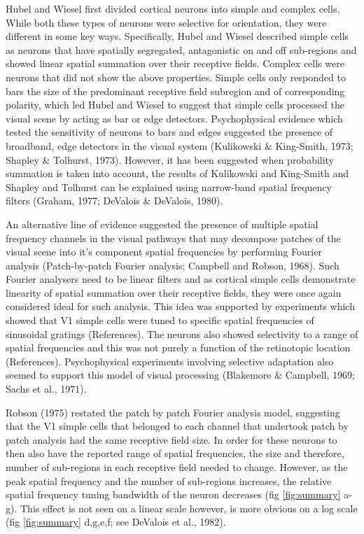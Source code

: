 	Hubel and Wiesel first divided cortical neurons into simple and complex cells. While both these types of neurons were selective for orientation, they were different in some key ways. Specifically, Hubel and Wiesel described simple cells as neurons that have spatially segregated, antagonistic on and off sub-regions and showed linear spatial summation over their receptive fields. Complex cells were neurons that did not show the above properties. Simple cells only responded to bars the size of the predominant receptive field subregion and of corresponding polarity, which led Hubel and Wiesel to suggest that simple cells processed the visual scene by acting as bar or edge detectors. Psychophysical evidence which tested the sensitivity of neurons to bars and edges suggested the presence of broadband, edge detectors in the visual system (Kulikowski \& King-Smith, 1973; Shapley \& Tolhurst, 1973). However, it has been suggested when probability summation is taken into account, the results of Kulikowski and King-Smith and Shapley and Tolhurst can be explained using narrow-band spatial frequency filters (Graham, 1977; DeValois \& DeValois, 1980).
	
	An alternative line of evidence suggested the presence of multiple spatial frequency channels in the visual pathways that may decompose patches of the visual scene into it's component spatial frequencies by performing Fourier analysis (Patch-by-patch Fourier analysis; Campbell and Robson, 1968). Such Fourier analysers need to be linear filters and as cortical simple cells demonstrate linearity of spatial summation over their receptive fields, they were once again considered ideal for such analysis. This idea was supported by experiments which showed that V1 simple cells were tuned to specific spatial frequencies of sinusoidal gratings (References). The neurons also showed selectivity to a range of spatial frequencies and this was not purely a function of the retinotopic location (References). Psychophysical experiments involving selective adaptation also seemed to support this model of visual processing (Blakemore \& Campbell, 1969; Sachs et al., 1971).
	
	Robson (1975) restated the patch by patch Fourier analysis model, suggesting that the V1 simple cells that belonged to each channel that undertook patch by patch analysis had the same receptive field size. In order for these neurons to then also have the reported range of spatial frequencies, the size and therefore, number of sub-regions in each receptive field needed to change. However, as the peak spatial frequency and the number of sub-regions increases, the relative spatial frequency tuning bandwidth of the neuron decreases (fig \ref{fig:summary} a-g). This effect is not seen on a linear scale however, is more obvious on a log scale (fig \ref{fig:summary} d,g,e,f; see DeValois et al., 1982).
	
